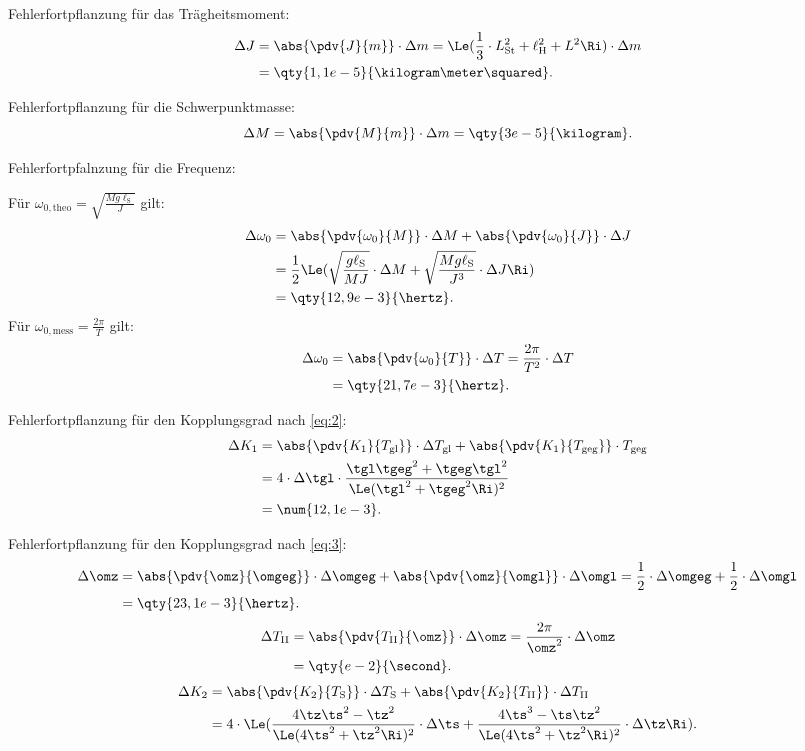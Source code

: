 \documentclass[
12pt,
a4paper,
bibliography=totocnumbered, %
BCOR=1cm, %
oneside, %
]{scrartcl}
\newcommand{\lh}{\ell_{\mathrm{H}}}
\newcommand{\ls}{\ell_{\mathrm{S}}}
\begin{document}
Fehlerfortpflanzung für das Trägheitsmoment:
\begin{align*}
	\Delta J &= \abs{\pdv{J}{m}} \cdot \Delta m = \Le(\frac{1}{3} \cdot L_{\text{St}}^2 + \lh^2 + L^2\Ri) \cdot \Delta m\\
	&= \qty{1,1e-5}{\kilogram\meter\squared}.
\end{align*}

Fehlerfortpflanzung für die Schwerpunktmasse:
\begin{equation*}
	\Delta M = \abs{\pdv{M}{m}} \cdot \Delta m = \qty{3e-5}{\kilogram}.
\end{equation*}

Fehlerfortpfalnzung für die Frequenz:

Für \(\omega_{0,\text{theo}} = \sqrt{\frac{Mg\ls}{J}}\) gilt:
\begin{align*}
	\Delta \omega_0 &= \abs{\pdv{\omega_0}{M}} \cdot \Delta M + \abs{\pdv{\omega_0}{J}} \cdot \Delta J\\
	&= \frac{1}{2} \Le(\sqrt{\frac{g\ls}{MJ}} \cdot \Delta M + \sqrt{\frac{Mg\ls}{J^3}} \cdot \Delta J\Ri)\\
	&= \qty{12,9e-3}{\hertz}.
\end{align*}
Für \(\omega_{0,\text{mess}} = \frac{2\pi}{T}\) gilt:
\begin{align*}
	\Delta \omega_0 &= \abs{\pdv{\omega_0}{T}} \cdot \Delta T = \frac{2\pi}{T^2} \cdot \Delta T\\
	&= \qty{21,7e-3}{\hertz}.
\end{align*}

Fehlerfortpflanzung für den Kopplungsgrad nach \autoref{eq:2}:
\begin{align*}
	\Delta K_1 &= \abs{\pdv{K_1}{T_{\text{gl}}}} \cdot \Delta T_{\text{gl}} + \abs{\pdv{K_1}{T_{\text{geg}}}} \cdot T_{\text{geg}}\\
	&= 4 \cdot \Delta \tgl \cdot \frac{\tgl\tgeg^2 + \tgeg\tgl^2}{\Le(\tgl^2 + \tgeg^2\Ri)^2}\\
	&=\num{12,1e-3}.
\end{align*}

Fehlerfortpflanzung für den Kopplungsgrad nach \autoref{eq:3}:
\begin{align*}
	\Delta \omz &= \abs{\pdv{\omz}{\omgeg}} \cdot \Delta \omgeg + \abs{\pdv{\omz}{\omgl}} \cdot \Delta \omgl = \frac{1}{2} \cdot \Delta \omgeg + \frac{1}{2} \cdot \Delta \omgl\\
	&= \qty{23,1e-3}{\hertz}.
\end{align*}
\begin{align*}
	\Delta T_{\text{II}} &= \abs{\pdv{T_{\text{II}}}{\omz}} \cdot \Delta \omz = \frac{2\pi}{\omz^2} \cdot \Delta \omz\\
	&= \qty{e-2}{\second}.
\end{align*}
\begin{align*}
	\Delta K_2 &= \abs{\pdv{K_2}{T_{\text{S}}}} \cdot \Delta T_{\text{S}} + \abs{\pdv{K_2}{T_{\text{II}}}} \cdot \Delta T_{\text{II}}\\
	&= 4 \cdot \Le(\frac{4 \tz\ts^2 - \tz^2}{\Le(4\ts^2 + \tz^2\Ri)^2} \cdot \Delta \ts + \frac{4\ts^3 - \ts\tz^2}{\Le(4\ts^2 + \tz^2\Ri)^2} \cdot \Delta \tz\Ri).
\end{align*}
\end{document}
